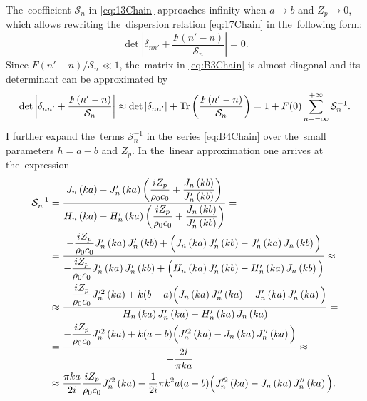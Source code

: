 
The~coefficient $\mathcal{S}_n$ in \cref{eq:13Chain} approaches infinity when $a\rightarrow b$ and $Z_p \rightarrow 0$, which allows rewriting the~dispersion relation \cref{eq:17Chain} in the~following form:
\begin{equation}
\label{eq:B3Chain}
\det \left|\delta_{nn'} + \dfrac{F(n'-n)}{\mathcal{S}_n}\right|=0.
\end{equation}
Since $F(n'-n)/\mathcal{S}_n \ll 1$, the~matrix in \cref{eq:B3Chain} is almost diagonal and its determinant can be approximated by
\begin{equation}
\label{eq:B4Chain}
\det \left|\delta_{nn'} + \dfrac{F(n'-n)}{\mathcal{S}_n}\right| \approx \det |\delta_{nn'}| + \text{Tr}\left( \dfrac{F(n'-n)}{\mathcal{S}_n}\right)
= 1 + F(0)\sum_{n=-\infty}^{+\infty}\mathcal{S}_n^{-1}.
\end{equation}
I further expand the~terms $\mathcal{S}_n^{-1}$ in the~series \cref{eq:B4Chain} over the~small parameters $h=a-b$ and $Z_p$.
In the~linear approximation one arrives at the~expression
\begin{align}
\label{eq:B5Chain}
\mathcal{S}_n^{-1} &= \dfrac{J_n\left(k a\right)-J'_n\left(k a\right)\left(\dfrac{i Z_p}{\rho_0 c_0}+\dfrac{J_{n}\left(k b\right)}{J'_{n}\left(k b\right)}\right)}{H_n\left(k a\right)-H'_n\left(k a\right)\left(\dfrac{i Z_p}{\rho_0 c_0}+\dfrac{J_{n}\left(k b\right)}{J'_{n}\left(k b\right)}\right)} = \\
%
&= \dfrac{-\dfrac{i Z_p}{\rho_0 c_0} J'_{n}\left(k a\right)J'_{n}\left(k b\right) + \Big(J_n\left(k a\right)J'_{n}\left(k b\right)-J'_n\left(k a\right)J_{n}\left(k b\right)\Big)}{-\dfrac{i Z_p}{\rho_0 c_0} J'_{n}\left(k a\right)J'_{n}\left(k b\right) + \Big(H_n\left(k a\right)J'_{n}\left(k b\right)-H'_n\left(k a\right)J_{n}\left(k b\right)\Big)} \approx \notag\\
%
&\approx \dfrac{-\dfrac{i Z_p}{\rho_0 c_0} J'^{2}_{n}\left(k a\right) + k(b-a)\Big(J_n\left(k a\right)J''_{n}\left(k a\right)-J'_n\left(k a\right)J'_{n}\left(k a\right)\Big)}{H_n\left(k a\right)J'_{n}\left(k a\right)-H'_n\left(k a\right)J_{n}\left(k a\right)} = \notag \\
%
&= \dfrac{-\dfrac{i Z_p}{\rho_0 c_0} J'^{2}_{n}\left(k a\right) + k(a-b)\Big(J'^2_n\left(k a\right)-J_n\left(k a\right)J''_{n}\left(k a\right)\Big)}{-\dfrac{2i}{\pi k a}} \approx \notag \\
%
&\approx \dfrac{\pi k a}{2i}\dfrac{i Z_p}{\rho_0 c_0} J'^{2}_{n}\left(k a\right) - \dfrac{1}{2i} \pi k^2 a(a-b) \Big(J'^2_n\left(k a\right)-J_n\left(k a\right)J''_{n}\left(k a\right)\Big). \notag
\end{align}
